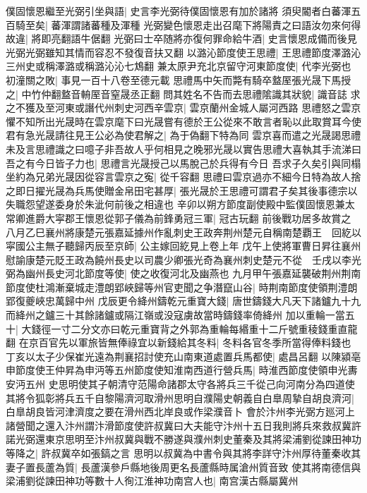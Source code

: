 僕固懷恩繼至光弼引坐與語|{
	史言李光弼待僕固懷恩有加於諸將}
須臾閽者白蕃渾五百騎至矣|{
	蕃渾謂諸蕃種及渾種}
光弼變色懷恩走出召麾下將陽責之曰語汝勿來何得故違|{
	將即亮翻語牛倨翻}
光弼曰士卒随將亦復何罪命給牛酒|{
	史言懷恩成備而後見光弼光弼雖知其情而容忍不發復音扶又翻}
以潞沁節度使王思禮|{
	王思禮節度澤潞沁三州史或稱澤潞或稱潞沁沁七鴆翻}
兼太原尹充北京留守河東節度使|{
	代李光弼也}
初潼關之敗|{
	事見一百十八卷至德元載}
思禮馬中矢而斃有騎卒盩厔張光晟下馬授之|{
	中竹仲翻盩音輈厔音窒晟丞正翻}
問其姓名不告而去思禮隂識其狀貌|{
	識音誌}
求之不獲及至河東或譖代州刺史河西辛雲京|{
	雲京蘭州金城人屬河西路}
思禮怒之雲京懼不知所出光晟時在雲京麾下曰光晟嘗有德於王公從來不敢言者恥以此取賞耳今使君有急光晟請往見王公必為使君解之|{
	為于偽翻下特為同}
雲京喜而遣之光晟謁思禮未及言思禮識之曰噫子非吾故人乎何相見之晚邪光晟以實告思禮大喜執其手流涕曰吾之有今日皆子力也|{
	思禮言光晟授己以馬脫己於兵得有今日}
吾求子久矣引與同榻坐約為兄弟光晟因從容言雲京之寃|{
	從千容翻}
思禮曰雲京過亦不細今日特為故人捨之即日擢光晟為兵馬使贈金帛田宅甚厚|{
	張光晟於王思禮可謂君子矣其後事德宗以失職怨望遂委身於朱泚何前後之相違也}
辛卯以朔方節度副使殿中監僕固懷恩兼太常卿進爵大寜郡王懷恩從郭子儀為前鋒勇冠三軍|{
	冠古玩翻}
前後戰功居多故賞之　八月乙巳襄州將康楚元張嘉延據州作亂刺史王政奔荆州楚元自稱南楚覇王　回紇以寜國公主無子聽歸丙辰至京師|{
	公主嫁回紇見上卷上年}
戊午上使將軍曹日昇往襄州慰諭康楚元貶王政為饒州長史以司農少卿張光奇為襄州刺史楚元不從　壬戌以李光弼為幽州長史河北節度等使|{
	使之收復河北及幽燕也}
九月甲午張嘉延襲破荆州荆南節度使杜鴻漸棄城走澧朗郢峽歸等州官吏聞之争潛竄山谷|{
	時荆南節度使領荆澧朗郢復夔峽忠萬歸中州}
戊辰更令絳州鑄乾元重寶大錢|{
	唐世鑄錢大凡天下諸鑪九十九而絳州之鑪三十其餘諸鑪或隔江嶺或没寇虜故當時鑄錢率倚絳州}
加以重輪一當五十|{
	大錢徑一寸二分文亦曰乾元重寶背之外郭為重輪每緡重十二斤號重稜錢重直龍翻}
在京百官先以軍旅皆無俸祿宜以新錢給其冬料|{
	冬料各官冬季所當得俸料錢也}
丁亥以太子少保崔光遠為荆襄招討使充山南東道處置兵馬都使|{
	處昌呂翻}
以陳潁亳申節度使王仲昇為申沔等五州節度使知淮南西道行營兵馬|{
	時淮西節度使領申光夀安沔五州}
史思明使其子朝清守范陽命諸郡太守各將兵三千從己向河南分為四道使其將令狐彰將兵五千自黎陽濟河取滑州思明自濮陽史朝義自白臯周摯自胡良濟河|{
	白臯胡良皆河津濟度之要在滑州西北岸良或作梁濮音卜}
會於汴州李光弼方廵河上諸營聞之還入汴州謂汴滑節度使許叔冀曰大夫能守汴州十五日我則將兵來救叔冀許諾光弼還東京思明至汴州叔冀與戰不勝遂與濮州刺史董秦及其將梁浦劉從諫田神功等降之|{
	許叔冀卒如張鎬之言}
思明以叔冀為中書令與其將李詳守汴州厚待董秦收其妻子置長蘆為質|{
	長蘆漢參戶縣地後周更名長蘆縣時属滄州質音致}
使其將南德信與梁浦劉從諫田神功等數十人徇江淮神功南宫人也|{
	南宫漢古縣屬冀州}
